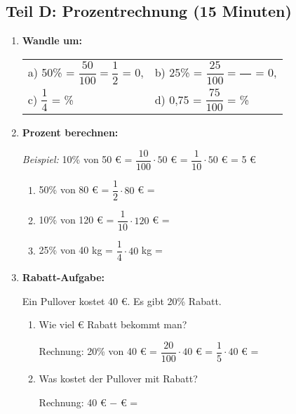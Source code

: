\subsection*{Teil D: Prozentrechnung (15 Minuten)}

\begin{enumerate}[resume, label=\arabic*.]
    \item \textbf{Wandle um:}

    \begin{tabular}{ll}
        a) 50\% = $\dfrac{50}{100} = \dfrac{1}{2}$ = 0,\underline{\hspace{1cm}} & 
        b) 25\% = $\dfrac{25}{100} = \dfrac{\phantom{00}}{\phantom{00}}$ = 0,\underline{\hspace{1cm}} \\[3ex]
        c) $\dfrac{1}{4}$ = \underline{\hspace{2cm}}\% & 
        d) 0,75 = $\dfrac{75}{100}$ = \underline{\hspace{2cm}}\%
    \end{tabular}

    \vspace{1cm}

    \item \textbf{Prozent berechnen:}

    \textit{Beispiel:} 10\% von 50 € = $\dfrac{10}{100} \cdot 50$ € = $\dfrac{1}{10} \cdot 50$ € = 5 €

    \begin{enumerate}[label=\alph*)]
        \item 50\% von 80 € = $\dfrac{1}{2} \cdot 80$ € = \underline{\hspace{3cm}}
        \item 10\% von 120 € = $\dfrac{1}{10} \cdot 120$ € = \underline{\hspace{3cm}}
        \item 25\% von 40 kg = $\dfrac{1}{4} \cdot 40$ kg = \underline{\hspace{3cm}}
    \end{enumerate}

    \vspace{0.5cm}

    \item \textbf{Rabatt-Aufgabe:}

    Ein Pullover kostet 40 €. Es gibt 20\% Rabatt.

    \begin{enumerate}[label=\alph*)]
        \item Wie viel € Rabatt bekommt man? 

        Rechnung: 20\% von 40 € = $\dfrac{20}{100} \cdot 40$ € = $\dfrac{1}{5} \cdot 40$ € = \underline{\hspace{3cm}}

        \item Was kostet der Pullover mit Rabatt? 

        Rechnung: 40 € $-$ \underline{\hspace{2cm}} € = \underline{\hspace{3cm}}
    \end{enumerate}
\end{enumerate}